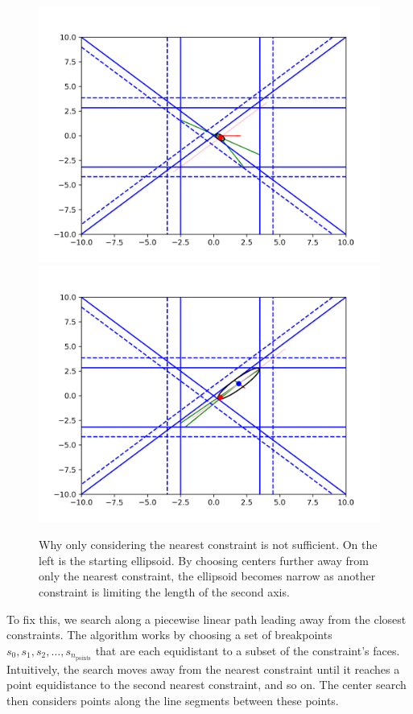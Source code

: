 \begin{figure}[ht]
    \centering
    \includegraphics[scale=0.4]{images/line_1.png}
    \includegraphics[scale=0.4]{images/line_2.png}
    \caption[Why only considering the nearest constraint is not sufficient. ]
        {Why only considering the nearest constraint is not sufficient.   On the left is the starting ellipsoid.
    	By choosing centers further away from only the nearest constraint, the ellipsoid becomes narrow as another constraint is limiting the length of the second axis.
	}
    \label{first_line_search}
\end{figure}

To fix this, we search along a piecewise linear path leading away from the closest constraints.   
The algorithm works by choosing a set of breakpoints $s_0, s_1, s_2, \ldots, s_{n_{\text{points}}}$
that are each equidistant to a subset of the constraint's faces.
Intuitively, the search moves away from the nearest constraint until it reaches a point equidistance to the second nearest constraint, and so on.
The center search then considers points along the line segments between these points.

